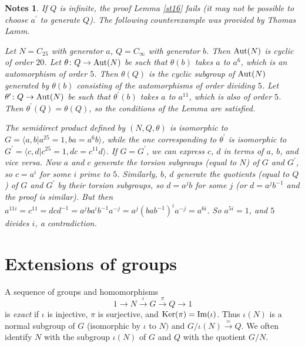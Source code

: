 \documentclass[a4paper,11pt,final]{memoir}%
\newtheorem*{nt}{Notes}
\theoremstyle{nonumberplain}
\begin{document}
\begin{nt}
If $Q$ is infinite, the proof Lemma \ref{st16} fails (it may not be possible
to choose $a^{\prime}$ to generate $Q$). The following counterexample was
provided by Thomas Lamm.

Let $N=C_{25}$ with generator $a$, $Q=C_{\infty}$ with generator $b$. Then
$\operatorname{Aut}(N)$ is cyclic of order $20$. Let $\theta\colon Q\rightarrow\operatorname{Aut}(N)$ be
such that $\theta(b)$ takes $a$ to $a^{6}$, which is an automorphism of order
$5$. Then $\theta(Q)$ is the cyclic subgroup of $\operatorname{Aut}(N)$ generated by
$\theta(b)$ consisting of the automorphisms of order dividing $5$. Let
$\theta^{\prime}\colon Q\rightarrow\operatorname{Aut}(N)$ be such that $\theta^{\prime}(b)$
takes $a$ to $a^{11}$, which is also of order $5$. Then $\theta^{\prime
}(Q)=\theta(Q)$, so the conditions of the Lemma are satisfied.

The semidirect product defined by $(N,Q,\theta)$ is isomorphic to $G=\langle
a,b|a^{25}=1,ba=a^{6}b\rangle$, while the one corresponding to $\theta
^{\prime}$ is isomorphic to $G^{\prime}=\langle c,d|c^{25}=1,dc=c^{11}%
d\rangle$. If $G=G^{\prime}$, we can express $c$, $d$ in terms of $a$, $b$,
and vice versa. Now $a$ and $c$ generate the torsion subgroups (equal to $N$)
of $G$ and $G^{\prime}$, so $c=a^{i}$ for some $i$ prime to $5$. Similarly,
$b$, $d$ generate the quotients (equal to $Q$) of $G$ and $G^{\prime}$ by
their torsion subgroups, so $d=a^{j}b$ for some $j$ (or $d=a^{j}b^{-1}$ and
the proof is similar). But then $a^{11i}=c^{11}=dcd^{-1}=a^{j}ba^{i}%
b^{-1}a^{-j}=a^{j}(bab^{-1})^{i}a^{-j}=a^{6i}$. So $a^{5i}=1$, and $5$ divides
$i$, a contradiction.
\end{nt}

\section{Extensions of groups}

A sequence of groups and homomorphisms
\begin{equation}
1\rightarrow N\overset{\iota}{\rightarrow}G\overset{\pi}{\rightarrow
}Q\rightarrow1 \label{e27}%
\end{equation}
is \emph{exact}%
if $\iota$ is injective, $\pi$ is surjective, and $\operatorname{Ker}(\pi)=\operatorname{Im}(\iota)$. Thus
$\iota(N)$ is a normal subgroup of $G$ (isomorphic by $\iota$ to $N)$ and
$G/\iota(N)\overset{\simeq}{\longrightarrow}Q$. We often identify $N$ with the
subgroup $\iota(N)$ of $G$ and $Q$ with the quotient $G/N.$
\end{document}
